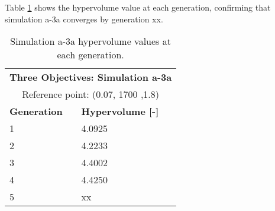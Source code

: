 Table \ref{tab:a3a-hypervolume} shows the hypervolume value at each generation, 
confirming that simulation a-3a converges by generation xx. 
\begin{table}[htbp!]
    \centering
    \onehalfspacing
    \caption{Simulation a-3a hypervolume values at each generation.}
	\label{tab:a3a-hypervolume}
    \footnotesize
    \begin{tabular}{ll}
    \hline 
    \multicolumn{2}{c}{\textbf{Three Objectives: Simulation a-3a}} \\
    \multicolumn{2}{c}{Reference point: (0.07, 1700 ,1.8)} \\
    \hline 
    \textbf{Generation} & \textbf{Hypervolume [-]} \\
    \hline
    1 & 4.0925 \\
    2 & 4.2233 \\
    3 & 4.4002 \\
    4 & 4.4250 \\
    5 & xx \\
    \hline
    \end{tabular}
\end{table}

